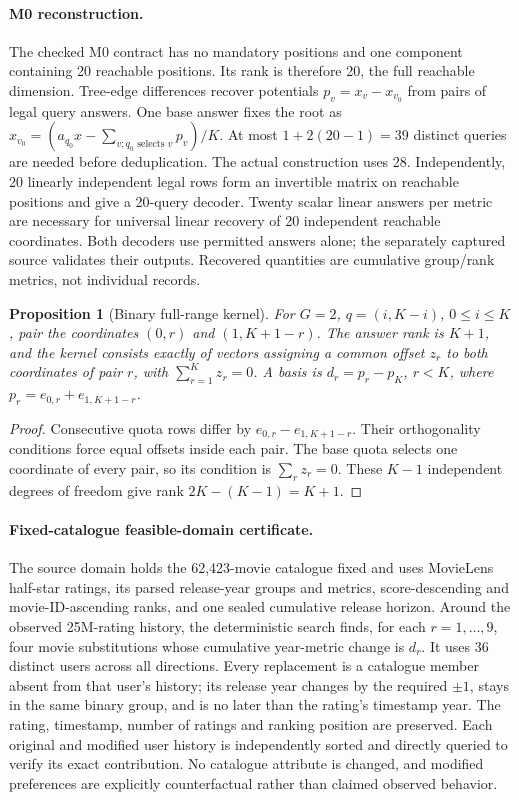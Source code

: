 \documentclass[10pt]{article}
\newtheorem{proposition}{Proposition}
\begin{document}
\paragraph{M0 reconstruction.}
The checked M0 contract has no mandatory positions and one component containing
20 reachable positions. Its rank is therefore 20, the full reachable dimension.
Tree-edge differences recover potentials $p_v=x_v-x_{v_0}$ from pairs of legal
query answers. One base answer fixes the root as
$x_{v_0}=(a_{q_0}x-\sum_{v:q_0\text{ selects }v}p_v)/K$.
At most $1+2(20-1)=39$ distinct queries are needed before deduplication.
The actual construction uses 28. Independently, 20 linearly independent legal
rows form an invertible matrix on reachable positions and give a 20-query
decoder. Twenty scalar linear answers per metric are necessary for universal
linear recovery of 20 independent reachable coordinates. Both decoders use
permitted answers alone; the separately captured source validates their outputs.
Recovered quantities are cumulative group/rank metrics, not individual records.

\begin{proposition}[Binary full-range kernel]
For $G=2$, $q=(i,K-i)$, $0\leq i\leq K$, pair the coordinates
$(0,r)$ and $(1,K+1-r)$. The answer rank is $K+1$, and the kernel consists
exactly of vectors assigning a common offset $z_r$ to both coordinates of pair
$r$, with $\sum_{r=1}^Kz_r=0$. A basis is $d_r=p_r-p_K$, $r<K$, where
$p_r=e_{0,r}+e_{1,K+1-r}$.
\end{proposition}
\begin{proof}
Consecutive quota rows differ by $e_{0,r}-e_{1,K+1-r}$. Their orthogonality
conditions force equal offsets inside each pair. The base quota selects one
coordinate of every pair, so its condition is $\sum_rz_r=0$. These $K-1$
independent degrees of freedom give rank $2K-(K-1)=K+1$.
\end{proof}

\paragraph{Fixed-catalogue feasible-domain certificate.}
The source domain holds the 62,423-movie catalogue fixed and uses MovieLens
half-star ratings, its parsed release-year groups and metrics, score-descending
and movie-ID-ascending ranks, and one sealed cumulative release horizon.
Around the observed 25M-rating history, the deterministic search finds, for each
$r=1,\ldots,9$, four movie substitutions whose cumulative year-metric change
is $d_r$. It uses 36 distinct users across all directions. Every replacement
is a catalogue member absent from that user's history; its release year changes
by the required $\pm1$, stays in the same binary group, and is no later than
the rating's timestamp year. The rating, timestamp, number of ratings and
ranking position are preserved. Each original and modified user history is
independently sorted and directly queried to verify its exact contribution.
No catalogue attribute is changed, and modified preferences are explicitly
counterfactual rather than claimed observed behavior.
\end{document}
